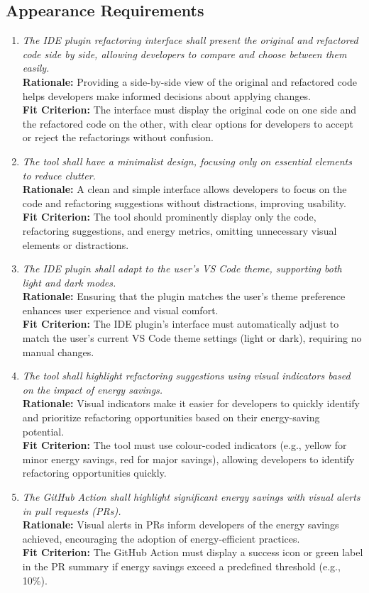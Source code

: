 \documentclass[12pt]{article}
\begin{document}
\subsection{Appearance Requirements}
\begin{enumerate}[label=LFR-AP \arabic*., wide=0pt, leftmargin=*]
    \item \emph{The IDE plugin refactoring interface shall present the original and refactored code side by side, allowing developers to compare and choose between them easily.}\\
    {\bf Rationale:} Providing a side-by-side view of the original and refactored code helps developers make informed decisions about applying changes.\\
    {\bf Fit Criterion:} The interface must display the original code on one side and the refactored code on the other, with clear options for developers to accept or reject the refactorings without confusion.
    \item \emph{The tool shall have a minimalist design, focusing only on essential elements to reduce clutter.}\\
    {\bf Rationale:} A clean and simple interface allows developers to focus on the code and refactoring suggestions without distractions, improving usability.\\
    {\bf Fit Criterion:} The tool should prominently display only the code, refactoring suggestions, and energy metrics, omitting unnecessary visual elements or distractions.
    \item \emph{The IDE plugin shall adapt to the user’s VS Code theme, supporting both light and dark modes.}\\
    {\bf Rationale:} Ensuring that the plugin matches the user's theme preference enhances user experience and visual comfort.\\
    {\bf Fit Criterion:} The IDE plugin’s interface must automatically adjust to match the user’s current VS Code theme settings (light or dark), requiring no manual changes.
    \item \emph{The tool shall highlight refactoring suggestions using visual indicators based on the impact of energy savings.}\\
    {\bf Rationale:} Visual indicators make it easier for developers to quickly identify and prioritize refactoring opportunities based on their energy-saving potential.\\
    {\bf Fit Criterion:} The tool must use colour-coded indicators (e.g., yellow for minor energy savings, red for major savings), allowing developers to identify refactoring opportunities quickly.
    \item \emph{The GitHub Action shall highlight significant energy savings with visual alerts in pull requests (PRs).}\\
    {\bf Rationale:} Visual alerts in PRs inform developers of the energy savings achieved, encouraging the adoption of energy-efficient practices.\\
    {\bf Fit Criterion:} The GitHub Action must display a success icon or green label in the PR summary if energy savings exceed a predefined threshold (e.g., 10\%).
\end{enumerate}
\end{document}
